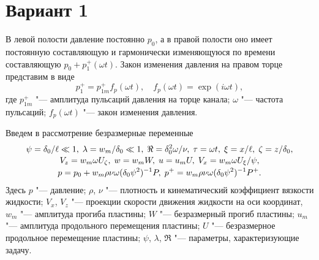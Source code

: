 \documentclass{article}
\begin{document}
\section*{Вариант 1}

В левой полости давление постоянно $p_0$, а в правой полости оно имеет постоянную
составляющую и гармонически изменяющуюся по времени составляющую $p_0 + p_1^+(\omega t)$.
Закон изменения давления на правом торце представим в виде
\begin{equation}
p_1^+ = p_{1m}^+ f_p(\omega t), \quad f_p(\omega t) = \exp(i\omega t),
\end{equation}
где $p_{1m}^+$ "--- амплитуда пульсаций давления на торце канала; $\omega$ "--- частота пульсаций;
$f_p(\omega t)$ "--- закон изменения давления.

Введем в рассмотрение безразмерные переменные
\begin{equation}
{\setlength{\jot}{1pt}
\begin{gathered}
\psi=\delta_0/\ell\ll1,\; \lambda=w_m/\delta_0\ll1,\; \Re=\delta_0^2\omega/\nu,\;
\tau=\omega t,\; \xi=x/\ell,\; \zeta=z/\delta_0,\\
V_z=w_m\omega U_\zeta,\; w=w_m W,\; u=u_m U,\; V_x=w_m\omega U_\xi/\psi,\\
p=p_0+w_m\rho\nu\omega(\delta_0\psi^2)^{-1}P,\;
p^+=w_m\rho\nu\omega(\delta_0\psi^2)^{-1}P^+.
\end{gathered}
}
\end{equation}
Здесь $p$ "--- давление; $\rho$, $\nu$ "--- плотность и кинематический коэффициент вязкости жидкости;
$V_x$, $V_z$ "--- проекции скорости движения жидкости на оси координат, $w_m$ "--- амплитуда прогиба
пластины; $W$ "--- безразмерный прогиб пластины; $u_m$ "--- амплитуда продольного перемещения
пластины; $U$ "--- безразмерное продольное перемещение пластины; $\psi$, $\lambda$, $\Re$ "--- параметры,
характеризующие задачу.
\end{document}
